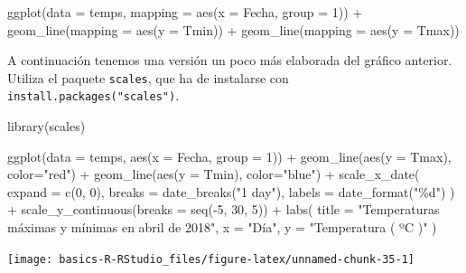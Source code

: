 \documentclass[
  title=normal,
  notoc,
  bib=normal]{mnye}
\newenvironment{Shaded}{\begin{snugshade}}{\end{snugshade}}
\newcommand{\AttributeTok}[1]{\textcolor[rgb]{0.77,0.63,0.00}{#1}}
\newcommand{\DecValTok}[1]{\textcolor[rgb]{0.00,0.00,0.81}{#1}}
\newcommand{\FunctionTok}[1]{\textcolor[rgb]{0.00,0.00,0.00}{#1}}
\newcommand{\NormalTok}[1]{#1}
\newcommand{\SpecialCharTok}[1]{\textcolor[rgb]{0.00,0.00,0.00}{#1}}
\newcommand{\StringTok}[1]{\textcolor[rgb]{0.31,0.60,0.02}{#1}}
\begin{document}
\begin{Shaded}
\begin{Highlighting}[]
\FunctionTok{ggplot}\NormalTok{(}\AttributeTok{data =}\NormalTok{ temps, }\AttributeTok{mapping =} \FunctionTok{aes}\NormalTok{(}\AttributeTok{x =}\NormalTok{ Fecha, }\AttributeTok{group =} \DecValTok{1}\NormalTok{)) }\SpecialCharTok{+} 
    \FunctionTok{geom\_line}\NormalTok{(}\AttributeTok{mapping =} \FunctionTok{aes}\NormalTok{(}\AttributeTok{y =}\NormalTok{ Tmin)) }\SpecialCharTok{+} 
    \FunctionTok{geom\_line}\NormalTok{(}\AttributeTok{mapping =} \FunctionTok{aes}\NormalTok{(}\AttributeTok{y =}\NormalTok{ Tmax)) }
\end{Highlighting}
\end{Shaded}

A continuación tenemos una versión un poco más elaborada del gráfico anterior. Utiliza el paquete \texttt{scales}, que ha de instalarse con \texttt{install.packages("scales")}.

\begin{Shaded}
\begin{Highlighting}[]
\FunctionTok{library}\NormalTok{(scales)}

\FunctionTok{ggplot}\NormalTok{(}\AttributeTok{data =}\NormalTok{ temps, }\FunctionTok{aes}\NormalTok{(}\AttributeTok{x =}\NormalTok{ Fecha, }\AttributeTok{group =} \DecValTok{1}\NormalTok{)) }\SpecialCharTok{+} 
    \FunctionTok{geom\_line}\NormalTok{(}\FunctionTok{aes}\NormalTok{(}\AttributeTok{y =}\NormalTok{ Tmax), }\AttributeTok{color=}\StringTok{"red"}\NormalTok{) }\SpecialCharTok{+} 
    \FunctionTok{geom\_line}\NormalTok{(}\FunctionTok{aes}\NormalTok{(}\AttributeTok{y =}\NormalTok{ Tmin), }\AttributeTok{color=}\StringTok{"blue"}\NormalTok{) }\SpecialCharTok{+} 
    \FunctionTok{scale\_x\_date}\NormalTok{(}
        \AttributeTok{expand =} \FunctionTok{c}\NormalTok{(}\DecValTok{0}\NormalTok{, }\DecValTok{0}\NormalTok{),}
        \AttributeTok{breaks =} \FunctionTok{date\_breaks}\NormalTok{(}\StringTok{"1 day"}\NormalTok{), }
        \AttributeTok{labels =} \FunctionTok{date\_format}\NormalTok{(}\StringTok{"\%d"}\NormalTok{)}
\NormalTok{    ) }\SpecialCharTok{+}
    \FunctionTok{scale\_y\_continuous}\NormalTok{(}\AttributeTok{breaks =} \FunctionTok{seq}\NormalTok{(}\SpecialCharTok{{-}}\DecValTok{5}\NormalTok{, }\DecValTok{30}\NormalTok{, }\DecValTok{5}\NormalTok{)) }\SpecialCharTok{+} 
    \FunctionTok{labs}\NormalTok{(}
        \AttributeTok{title =} \StringTok{"Temperaturas máximas y mínimas en abril de 2018"}\NormalTok{,}
        \AttributeTok{x =} \StringTok{"Día"}\NormalTok{,}
        \AttributeTok{y =} \StringTok{"Temperatura ( ºC )"}
\NormalTok{    )}
\end{Highlighting}
\end{Shaded}

\begin{center}\texttt{[image: basics-R-RStudio\_files/figure-latex/unnamed-chunk-35-1]} \end{center}

\printbibliography

%
\end{document}
